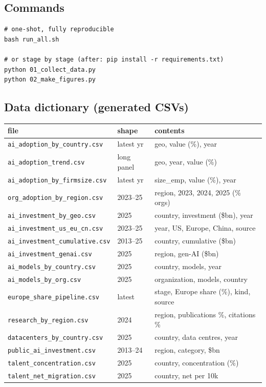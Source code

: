 \documentclass[11pt,a4paper]{article}
\newcommand{\code}[1]{\texttt{#1}}
\begin{document}
\subsection{Commands}
\begin{lstlisting}
# one-shot, fully reproducible
bash run_all.sh

# or stage by stage (after: pip install -r requirements.txt)
python 01_collect_data.py
python 02_make_figures.py
\end{lstlisting}

\subsection{Data dictionary (generated CSVs)}
\begin{center}
\renewcommand{\arraystretch}{1.15}
\begin{tabular}{@{}p{5.6cm} p{2.6cm} p{6.0cm}@{}}
\toprule
file & shape & contents \\
\midrule
\code{ai\_adoption\_by\_country.csv} & latest yr & geo, value (\%), year \\
\code{ai\_adoption\_trend.csv} & long panel & geo, year, value (\%) \\
\code{ai\_adoption\_by\_firmsize.csv} & latest yr & size\_emp, value (\%), year \\
\code{org\_adoption\_by\_region.csv} & 2023--25 & region, 2023, 2024, 2025 (\% orgs) \\
\code{ai\_investment\_by\_geo.csv} & 2025 & country, investment (\$bn), year \\
\code{ai\_investment\_us\_eu\_cn.csv} & 2023--25 & year, US, Europe, China, source \\
\code{ai\_investment\_cumulative.csv} & 2013--25 & country, cumulative (\$bn) \\
\code{ai\_investment\_genai.csv} & 2025 & region, gen-AI (\$bn) \\
\code{ai\_models\_by\_country.csv} & 2025 & country, models, year \\
\code{ai\_models\_by\_org.csv} & 2025 & organization, models, country \\
\code{europe\_share\_pipeline.csv} & latest & stage, Europe share (\%), kind, source \\
\code{research\_by\_region.csv} & 2024 & region, publications \%, citations \% \\
\code{datacenters\_by\_country.csv} & 2025 & country, data centres, year \\
\code{public\_ai\_investment.csv} & 2013--24 & region, category, \$bn \\
\code{talent\_concentration.csv} & 2025 & country, concentration (\%) \\
\code{talent\_net\_migration.csv} & 2025 & country, net per 10k \\
\bottomrule
\end{tabular}
\end{center}
\end{document}

